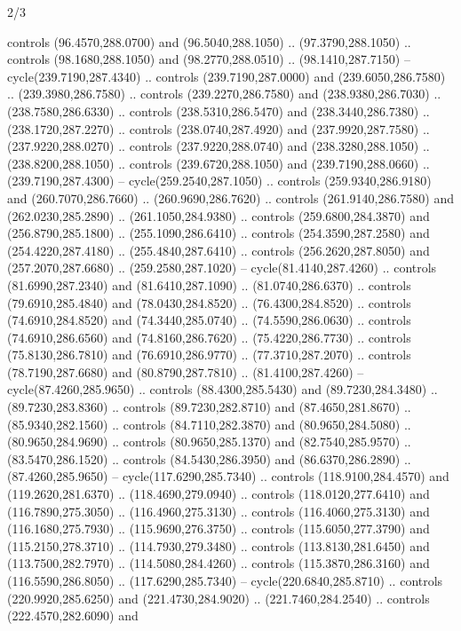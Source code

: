 \begin{flagdescription}{2/3}
\begin{scope}[xshift=0.5\flaglength,yshift=0.5\flagwidth,scale=\stretchfactor]
\begin{scope}[scale=0.001645\flagwidth,yshift=65mm,xshift=-63mm]
\begin{scope}[y=0.80pt, x=0.80pt, yscale=-1,]
\begin{scope}[cm={{1.33333,0.0,0.0,1.33333,(0.0,1e-05)}}]
  controls (96.4570,288.0700) and (96.5040,288.1050) .. (97.3790,288.1050) ..
  controls (98.1680,288.1050) and (98.2770,288.0510) .. (98.1410,287.7150) --
  cycle(239.7190,287.4340) .. controls (239.7190,287.0000) and
  (239.6050,286.7580) .. (239.3980,286.7580) .. controls (239.2270,286.7580) and
  (238.9380,286.7030) .. (238.7580,286.6330) .. controls (238.5310,286.5470) and
  (238.3440,286.7380) .. (238.1720,287.2270) .. controls (238.0740,287.4920) and
  (237.9920,287.7580) .. (237.9220,288.0270) .. controls (237.9220,288.0740) and
  (238.3280,288.1050) .. (238.8200,288.1050) .. controls (239.6720,288.1050) and
  (239.7190,288.0660) .. (239.7190,287.4300) -- cycle(259.2540,287.1050) ..
  controls (259.9340,286.9180) and (260.7070,286.7660) .. (260.9690,286.7620) ..
  controls (261.9140,286.7580) and (262.0230,285.2890) .. (261.1050,284.9380) ..
  controls (259.6800,284.3870) and (256.8790,285.1800) .. (255.1090,286.6410) ..
  controls (254.3590,287.2580) and (254.4220,287.4180) .. (255.4840,287.6410) ..
  controls (256.2620,287.8050) and (257.2070,287.6680) .. (259.2580,287.1020) --
  cycle(81.4140,287.4260) .. controls (81.6990,287.2340) and (81.6410,287.1090)
  .. (81.0740,286.6370) .. controls (79.6910,285.4840) and (78.0430,284.8520) ..
  (76.4300,284.8520) .. controls (74.6910,284.8520) and (74.3440,285.0740) ..
  (74.5590,286.0630) .. controls (74.6910,286.6560) and (74.8160,286.7620) ..
  (75.4220,286.7730) .. controls (75.8130,286.7810) and (76.6910,286.9770) ..
  (77.3710,287.2070) .. controls (78.7190,287.6680) and (80.8790,287.7810) ..
  (81.4100,287.4260) -- cycle(87.4260,285.9650) .. controls (88.4300,285.5430)
  and (89.7230,284.3480) .. (89.7230,283.8360) .. controls (89.7230,282.8710)
  and (87.4650,281.8670) .. (85.9340,282.1560) .. controls (84.7110,282.3870)
  and (80.9650,284.5080) .. (80.9650,284.9690) .. controls (80.9650,285.1370)
  and (82.7540,285.9570) .. (83.5470,286.1520) .. controls (84.5430,286.3950)
  and (86.6370,286.2890) .. (87.4260,285.9650) -- cycle(117.6290,285.7340) ..
  controls (118.9100,284.4570) and (119.2620,281.6370) .. (118.4690,279.0940) ..
  controls (118.0120,277.6410) and (116.7890,275.3050) .. (116.4960,275.3130) ..
  controls (116.4060,275.3130) and (116.1680,275.7930) .. (115.9690,276.3750) ..
  controls (115.6050,277.3790) and (115.2150,278.3710) .. (114.7930,279.3480) ..
  controls (113.8130,281.6450) and (113.7500,282.7970) .. (114.5080,284.4260) ..
  controls (115.3870,286.3160) and (116.5590,286.8050) .. (117.6290,285.7340) --
  cycle(220.6840,285.8710) .. controls (220.9920,285.6250) and
  (221.4730,284.9020) .. (221.7460,284.2540) .. controls (222.4570,282.6090) and

\end{scope}
\end{scope}
\end{scope}
\end{scope}
\end{flagdescription}
